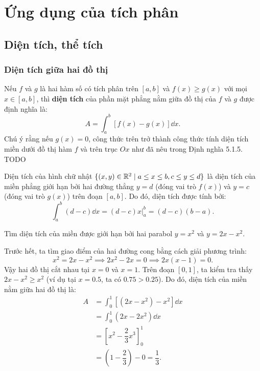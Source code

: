 \section{Ứng dụng của tích phân}

\subsection{Diện tích, thể tích}

\subsubsection{Diện tích giữa hai đồ thị}
Nếu $f$ và $g$ là hai hàm số có tích phân trên $[a, b]$ và $f(x) \ge g(x)$ với mọi $x \in [a, b]$, thì \textbf{diện tích} của phần mặt phẳng nằm giữa đồ thị của $f$ và $g$ được định nghĩa là:
\[ A = \int_a^b [f(x) - g(x)] \dd x. \]
Chú ý rằng nếu $g(x) = 0$, công thức trên trở thành công thức tính diện tích miền dưới đồ thị hàm $f$ và trên trục $Ox$ như đã nêu trong Định nghĩa 5.1.5. TODO

\begin{example}
    Diện tích của hình chữ nhật $\{(x, y) \in \mathbb{R}^2 \mid a \le x \le b, c \le y \le d\}$ là diện tích của miền phẳng giới hạn bởi hai đường thẳng $y=d$ (đóng vai trò $f(x)$) và $y=c$ (đóng vai trò $g(x)$) trên đoạn $[a, b]$. Do đó, diện tích được tính bởi:
    \[ \int_a^b (d - c) \dd x = (d-c)x \bigg|_a^b = (d-c)(b-a). \]
\end{example}

\begin{example}
    Tìm diện tích của miền được giới hạn bởi hai parabol $y = x^2$ và $y = 2x - x^2$.
\end{example}
\begin{solution}
    Trước hết, ta tìm giao điểm của hai đường cong bằng cách giải phương trình:
    \[ x^2 = 2x - x^2 \implies 2x^2 - 2x = 0 \implies 2x(x-1) = 0. \]
    Vậy hai đồ thị cắt nhau tại $x=0$ và $x=1$. Trên đoạn $[0, 1]$, ta kiểm tra thấy $2x - x^2 \ge x^2$ (ví dụ tại $x=0.5$, ta có $0.75 > 0.25$). Do đó, diện tích của miền nằm giữa hai đồ thị là:
    \begin{align*}
        A &= \int_0^1 \left[(2x - x^2) - x^2\right] \dd x \\
        &= \int_0^1 (2x - 2x^2) \dd x \\
        &= \left[x^2 - \dfrac{2}{3}x^3\right]_0^1 \\
        &= \left(1 - \dfrac{2}{3}\right) - 0 = \dfrac{1}{3}.
    \end{align*}
\end{solution}

